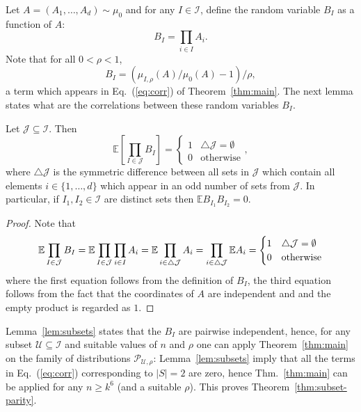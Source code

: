 \documentclass[final, 12pt]{colt2018}
\renewcommand{\eqref}[1]{Eq.~(\ref{#1})}
\newcommand{\thmref}[1]{Thm.~\ref{#1}}
\begin{document}
Let $A=(A_1,\dots,A_d) \sim \mu_0$ and for any $I \in \mathcal{I}$, define the random variable $B_I$ as a function of $A$: 
\begin{equation} \label{eq:BCorr}
B_I = \prod_{i\in I} A_i.
\end{equation}
Note that for all $0<\rho<1$, 
\begin{equation} \label{eq:corr-BI}
B_I = (\mu_{I,\rho}(A)/\mu_0(A) - 1)/\rho,
\end{equation}
a term which appears in \eqref{eq:corr} of Theorem~\ref{thm:main}.
The next lemma states what are the correlations between these random variables $B_I$.
\begin{lemma} \label{lem:subsets}
Let $\mathcal{J} \subseteq \mathcal{I}$. Then
\[
\mathbb{E} \left[ \prod_{I\in \mathcal{J}} B_I \right] = \begin{cases}
1 & \bigtriangleup \mathcal{J} = \emptyset \\
0 & \text{otherwise}
\end{cases},
\]
where $\bigtriangleup \mathcal{J}$ is the symmetric difference between all sets in $\mathcal{J}$ which contain all elements $i \in \{1,\dots,d\}$ which appear in an odd number of sets from $\mathcal{J}$.
In particular, if $I_1, I_2 \in \mathcal{I}$ are distinct sets then $\mathbb{E} B_{I_1}B_{I_2} = 0$.
\end{lemma}
\begin{proof}
Note that 
\begin{align}
\mathbb{E} \prod_{I \in \mathcal{J}} B_I
= \mathbb{E}\prod_{I \in \mathcal{J}} \prod_{i \in I} A_i 
= \mathbb{E} \prod_{i \in \bigtriangleup \mathcal{J}} A_i\notag
= \prod_{i \in \bigtriangleup \mathcal{J}} \mathbb{E} A_i\notag
= \begin{cases} 
1 & \bigtriangleup \mathcal{J} = \emptyset \\
0 & \text{otherwise}
\end{cases}
\end{align}
where the first equation follows from the definition of $B_I$, the third equation follows from the fact that the coordinates of $A$ are independent and and the empty product is regarded as $1$.
\end{proof}

Lemma~\ref{lem:subsets} states that the $B_I$ are pairwise independent, hence, for any subset $\mathcal{U} \subseteq \mathcal{I}$ and suitable values of $n$ and $\rho$  one can apply Theorem~\ref{thm:main} on the family of distributions $\mathcal{P}_{\mathcal{U},\rho}$:  Lemma~\ref{lem:subsets} imply that all the terms in \eqref{eq:corr} corresponding to $\lvert S \rvert = 2$ are zero, hence \thmref{thm:main} can be applied for any $n \ge k^6$ (and a suitable $\rho$). This proves Theorem~\ref{thm:subset-parity}.
\end{document}
